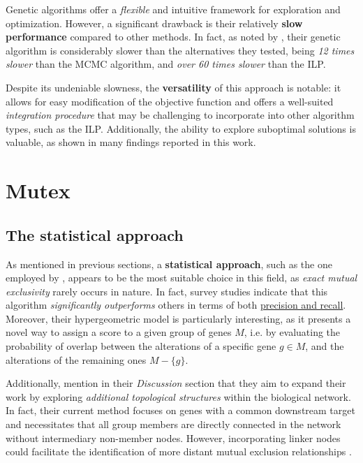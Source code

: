 Genetic algorithms offer a \textit{flexible} and intuitive framework for exploration and optimization. However, a significant drawback is their relatively \textbf{slow performance} compared to other methods. In fact, as noted by \textcite{mdpfinder}, their genetic algorithm is considerably slower than the alternatives they tested, being \textit{12 times slower} than the MCMC algorithm, and \textit{over 60 times slower} than the ILP.

Despite its undeniable slowness, the \textbf{versatility} of this approach is notable: it allows for easy modification of the objective function and offers a well-suited \textit{integration procedure} that may be challenging to incorporate into other algorithm types, such as the ILP. Additionally, the ability to explore suboptimal solutions is valuable, as shown in many findings reported in this work.

\section{Mutex}

\subsection{The statistical approach}

As mentioned in previous sections, a \textbf{statistical approach}, such as the one employed by \textcite{mutex}, appears to be the most suitable choice in this field, as \textit{exact mutual exclusivity} rarely occurs in nature. In fact, survey studies \cite{survey} indicate that this algorithm \textit{significantly outperforms} others in terms of both \href{https://en.wikipedia.org/wiki/Precision_and_recall}{precision and recall}. Moreover, their hypergeometric model is particularly interesting, as it presents a novel way to assign a score to a given group of genes $M$, i.e. by evaluating the probability of overlap between the alterations of a specific gene $g \in M$, and the alterations of the remaining ones $M-\{g\}$.

Additionally, \textcite{mutex} mention in their \textit{Discussion} section that they aim to expand their work by exploring \textit{additional topological structures} within the biological network. In fact, their current method focuses on genes with a common downstream target and necessitates that all group members are directly connected in the network without intermediary non-member nodes. However, incorporating linker nodes could facilitate the identification of more distant mutual exclusion relationships \cite{mutex}.


